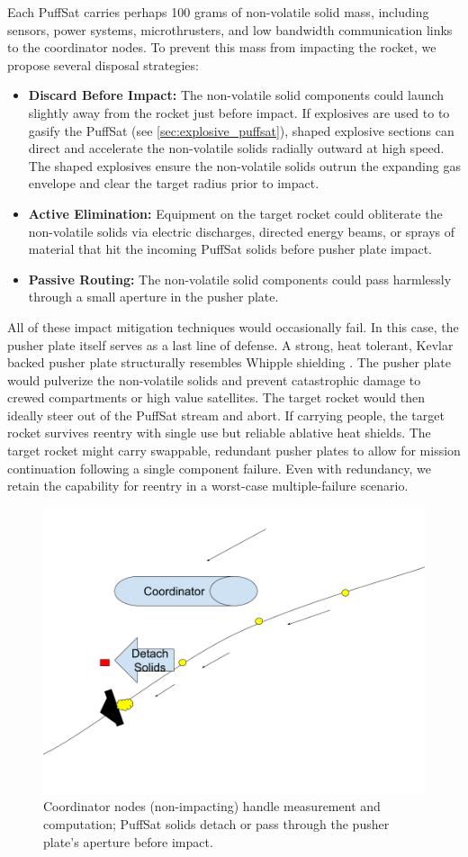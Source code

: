 \documentclass{article}
\begin{document}
Each PuffSat carries perhaps 100 grams of non-volatile solid mass, including sensors, power systems, microthrusters, and low bandwidth communication links to the coordinator nodes. To prevent this mass from impacting the rocket, we propose several disposal strategies:
\begin{itemize}
    \item \textbf{Discard Before Impact:}  The non-volatile solid components could launch slightly away from the rocket just before impact. If explosives are used to to gasify the PuffSat (see \autoref{sec:explosive_puffsat}), shaped explosive sections can direct and accelerate the non-volatile solids radially outward at high speed.   The shaped explosives ensure the non-volatile solids  outrun the expanding gas envelope and clear the target radius prior to impact.  \label{item:discard_before_impact}
    \item \textbf{Active Elimination:} Equipment on the target rocket could obliterate the non-volatile solids via electric discharges, directed energy beams, or sprays of material that hit the incoming PuffSat solids before pusher plate impact.
    \item \textbf{Passive Routing:} The non-volatile solid components could pass harmlessly through a small aperture in the pusher plate.
\end{itemize} 

All of these impact mitigation techniques would occasionally fail.  In this case, the pusher plate itself serves as a last line of defense.   A strong, heat tolerant, Kevlar backed pusher plate structurally resembles  Whipple shielding \cite{whipple_shield}.  The pusher plate would pulverize the non-volatile solids and prevent catastrophic damage to crewed compartments or high value satellites.  The target rocket would then ideally steer out of the PuffSat stream and abort.  If carrying people, the target rocket survives reentry with single use but reliable ablative heat shields.  The target rocket might carry swappable, redundant pusher plates to allow for mission continuation following a single component failure.  Even with redundancy, we retain the capability for reentry in a  worst-case multiple-failure scenario.

\begin{figure}[htpb]
    \centering
    \includegraphics[width=0.5\linewidth]{images/Coordinator Nodes.png}
    \caption{Coordinator nodes (non-impacting) handle measurement and computation; PuffSat solids detach or pass through the pusher plate's aperture before impact.}
    \label{fig:coordinator-nodes}
\end{figure} 
\end{document}
